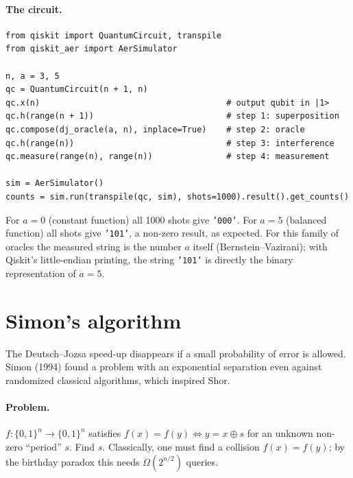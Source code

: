 \paragraph{The circuit.}
\begin{lstlisting}
from qiskit import QuantumCircuit, transpile
from qiskit_aer import AerSimulator

n, a = 3, 5
qc = QuantumCircuit(n + 1, n)
qc.x(n)                                      # output qubit in |1>
qc.h(range(n + 1))                           # step 1: superposition
qc.compose(dj_oracle(a, n), inplace=True)    # step 2: oracle
qc.h(range(n))                               # step 3: interference
qc.measure(range(n), range(n))               # step 4: measurement

sim = AerSimulator()
counts = sim.run(transpile(qc, sim), shots=1000).result().get_counts()
\end{lstlisting}
For $a=0$ (constant function) all 1000 shots give \texttt{'000'}. For $a=5$ (balanced function) all shots give \texttt{'101'}, a non-zero result, as expected. For this family of oracles the measured
string is the number $a$ itself (Bernstein--Vazirani); with Qiskit's little-endian printing, the string \texttt{'101'} is directly the binary representation of $a=5$.

\section{Simon's algorithm\starred}
The Deutsch--Jozsa speed-up disappears if a small probability of error is allowed. Simon (1994) found a problem with an exponential separation even against randomized classical algorithms,
which inspired Shor.

\paragraph{Problem.} $f:\{0,1\}^n\to\{0,1\}^n$ satisfies $f(x)=f(y)\iff y=x\oplus s$ for an unknown non-zero ``period'' $s$. Find $s$. Classically, one must find a collision $f(x)=f(y)$; by the birthday
paradox this needs $\Omega(2^{n/2})$ queries.

